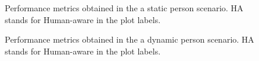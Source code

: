 \begin{figure}[t!]
%

\caption{Performance metrics obtained in the a static person scenario. HA stands for Human-aware in the plot labels.}
\label{fig:boxplots_singlePerson}
\end{figure}

\begin{figure}[!]
\centering
{}%
\hspace{0.1cm}
%

\caption{Performance metrics obtained in the a dynamic person scenario. HA stands for Human-aware in the plot labels.}
\label{fig:boxplots_singlePersonMov}
\end{figure}

